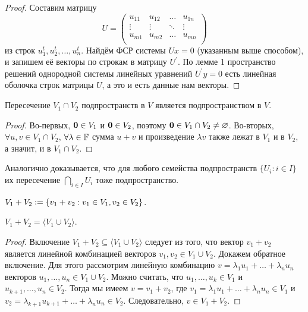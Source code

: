 \begin{proof}
    Составим матрицу
    \[
        U = 
        \begin{pmatrix}
            u_{11} & u_{12} & \ldots & u_{1n}\\
            \vdots & \vdots & \ddots & \vdots\\
            u_{m1} & u_{m2} & \ldots & u_{mn}\\
        \end{pmatrix}
    \]
    из строк $u_1^t, u_2^t, \ldots, u_n^t$. Найдём ФСР системы $Ux = 0$ (указанным выше способом), и запишем её векторы по строкам в матрицу $U^\prime$. По лемме 1 пространство решений однородной системы линейных уравнений $U^\prime y = 0$ есть линейная оболочка строк матрицы $U$, а это и есть данные нам векторы.
\end{proof}

\begin{proposal}
    Пересечение $V_1 \cap V_2$ подпространств в $V$ является подпространством в $V$.
\end{proposal}

\begin{proof}
    Во-первых, $\boldsymbol{0} \in V_1$ и $\boldsymbol{0} \in V_2$, поэтому $\boldsymbol{0} \in V_1 \cap V_2 \ne \varnothing$. Во-вторых, $\forall u, v \in V_1 \cap V_2$, $\forall \lambda \in \mathbb{F}$ сумма $u + v$ и произведение $\lambda v$ также лежат в $V_1$ и в $V_2$, а значит, и в $V_1 \cap V_2$.
\end{proof}

\begin{remark}
    Аналогично доказывается, что для любого семейства подпространств $\{U_i : i \in I\}$ их пересечение $\bigcap\limits_{i \in I}U_i$ тоже подпространство.
\end{remark}

\begin{definition}
    $V_1 + V_2 \vcentcolon = \{v_1 + v_2 : v_1 \in V_1, v_2 \in V_2\}$.
\end{definition}

\begin{proposal}
    $V_1 + V_2 = \langle V_1 \cup V_2\rangle$.
\end{proposal}

\begin{proof}
    Включение $V_1 + V_2 \subseteq \langle V_1 \cup V_2\rangle$ следует из того, что вектор $v_1 + v_2$ является линейной комбинацией векторов $v_1, v_2 \in V_1 \cup V_2$. Докажем обратное включение. Для этого рассмотрим линейную комбинацию $v = \lambda_1u_1 + \ldots + \lambda_nu_n$ векторов $u_1, \ldots, u_n \in V_1 \cup V_2$. Можно считать, что $u_1, \ldots, u_k \in V_1$ и $u_{k + 1}, \ldots, u_n \in V_2$. Тогда мы имеем $v = v_1 + v_2$, где $v_1 = \lambda_1u_1 + \ldots + \lambda_nu_n \in V_1$ и $v_2 = \lambda_{k + 1}u_{k + 1} + \ldots + \lambda_nu_n \in V_2$. Следовательно, $v \in V_1 + V_2$.
\end{proof}

